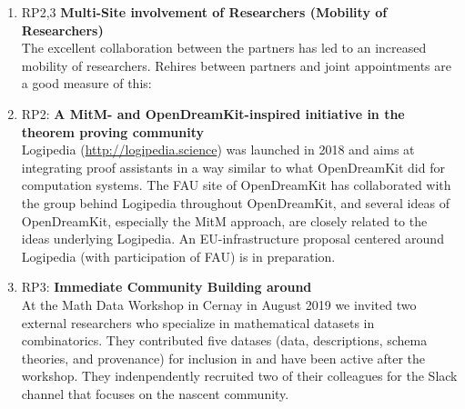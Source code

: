 \begin{enumerate}
\item RP2,3 \textbf{Multi-Site involvement of Researchers (Mobility of Researchers)}\\
  The excellent collaboration between the \ODK partners has led to an
  increased mobility of researchers. Rehires between partners and
  joint appointments are a good measure of this:
\item RP2: \textbf{A MitM- and OpenDreamKit-inspired initiative in the theorem proving community}\\
  Logipedia (\url {http://logipedia.science}) was launched in 2018 and aims at integrating proof assistants in a way similar to what OpenDreamKit did for computation systems.
  The FAU site of OpenDreamKit has collaborated with the group behind Logipedia throughout OpenDreamKit, and several ideas of OpenDreamKit, especially the MitM approach, are closely related to the ideas underlying Logipedia.
  An EU-infrastructure proposal centered around Logipedia (with participation of FAU) is in preparation.
\item RP3: \textbf{Immediate Community Building around \dmh}\\
    At the Math Data Workshop in Cernay in August 2019  we invited two external
    researchers who specialize in mathematical datasets in combinatorics. They contributed
    five datases (data, descriptions, schema theories, and provenance) for inclusion in
    \dmh and have been active after the workshop. They indenpendently recruited two of
    their colleagues for the Slack channel that focuses on the nascent community. 
\end{enumerate}

